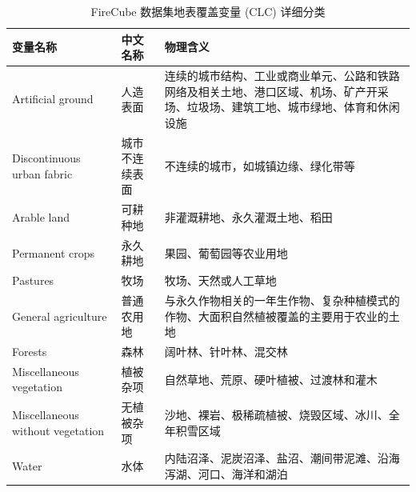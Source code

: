\begin{table}[htbp]
    \centering
    \caption{FireCube 数据集地表覆盖变量 (CLC) 详细分类}
    \label{tab:clc_vars}
    \renewcommand{\arraystretch}{1.5} 
    \begin{tabularx}{\textwidth}{ 
        >{\raggedright\arraybackslash}p{4.2cm} 
        >{\raggedright\arraybackslash}p{3cm} 
        >{\raggedright\arraybackslash}X }
        \toprule
        \textbf{变量名称} & \textbf{中文名称} & \textbf{物理含义} \\
        \midrule
        
        Artificial ground & 人造表面 & 连续的城市结构、工业或商业单元、公路和铁路网络及相关土地、港口区域、机场、矿产开采场、垃圾场、建筑工地、城市绿地、体育和休闲设施 \\
        \midrule
        
        Discontinuous urban fabric & 城市不连续表面 & 不连续的城市，如城镇边缘、绿化带等 \\
        \midrule
        
        Arable land & 可耕种地 & 非灌溉耕地、永久灌溉土地、稻田 \\
        \midrule
        
        Permanent crops & 永久耕地 & 果园、葡萄园等农业用地 \\
        \midrule
        
        Pastures & 牧场 & 牧场、天然或人工草地 \\
        \midrule
        
        General agriculture & 普通农用地 & 与永久作物相关的一年生作物、复杂种植模式的作物、大面积自然植被覆盖的主要用于农业的土地 \\
        \midrule
        
        Forests & 森林 & 阔叶林、针叶林、混交林 \\
        \midrule
        
        Miscellaneous vegetation & 植被杂项 & 自然草地、荒原、硬叶植被、过渡林和灌木 \\
        \midrule
        
        Miscellaneous without vegetation & 无植被杂项 & 沙地、裸岩、极稀疏植被、烧毁区域、冰川、全年积雪区域 \\
        \midrule
        
        Water & 水体 & 内陆沼泽、泥炭沼泽、盐沼、潮间带泥滩、沿海泻湖、河口、海洋和湖泊 \\
        \bottomrule
    \end{tabularx}
\end{table}

